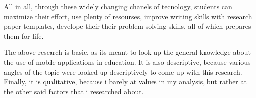 \documentclass[10pt,letterpaper]{article}
\begin{document}
All in all, through these widely changing chanels of tecnology, students can maximize their effort, use plenty of resourses, improve writing skills with research paper templates, develope their their problem-solving skills, all of which prepares them for life.

The above research is basic, as its meant to look up the general knowledge about the use of mobile applications in education. It is also descriptive, because various angles of the topic were looked up descriptively to come up with this research. Finally, it is qualitative, because i barely at values in my analysis, but rather at the other said factors that i researched about.
\end{document}

